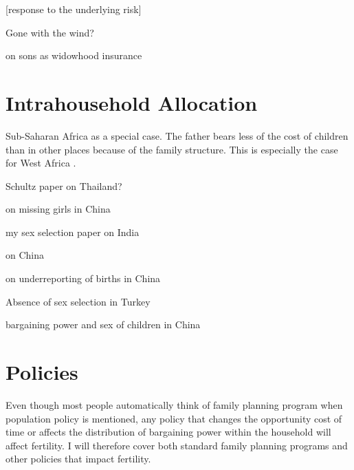 \documentclass[letterpaper,12pt]{article}
\begin{document}
[response to the underlying risk]

Gone with the wind?

\citep{Lambert2016} on sons as widowhood insurance 

\citep{Adsera2011}


\section{Intrahousehold Allocation}

Sub-Saharan Africa as a special case.
The father bears less of the cost of children than
in other places because of the family structure.
This is especially the case for West Africa \citep{Caldwell1992}.

Schultz paper on Thailand?

\citet{Ashraf2014}

\cite{merli00} on missing girls in China

\citep{Rasul2008}

\citep{Field2016}

my sex selection paper on India

\citet{Ebenstein2011} on China

\citet{merli00} on underreporting of births in China

Absence of sex selection in Turkey
\citet{Altindag2016}

bargaining power and sex of children in China \citet{Li2011}


\section{Policies}

Even though most people automatically think of family planning
program when population policy is mentioned, any policy that changes 
the opportunity cost of time or affects the distribution of
bargaining power within the household will affect fertility.
I will therefore cover both standard family planning programs
and other policies that impact fertility.

\end{document}
